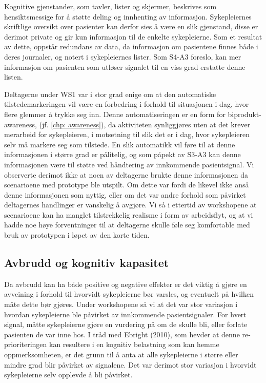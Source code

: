 \noindent
Kognitive gjenstander, som tavler, lister og skjermer, beskrives som hensiktsmessige for å støtte deling og innhenting av informasjon. Sykepleiernes skriftlige oversikt over pasienter kan derfor sies å være en slik gjenstand, disse er derimot private og gir kun informasjon til de enkelte sykepleierne. Som et resultat av dette, oppstår redundans av data, da informasjon om pasientene finnes både i deres journaler, og notert i sykepleiernes lister. Som S4-A3 foreslo, kan mer informasjon om pasienten som utløser signalet til en viss grad erstatte denne listen.

\noindent
Deltagerne under WS1 var i stor grad enige om at den automatiske tilstedemarkeringen vil være en forbedring i forhold til situasjonen i dag, hvor flere glemmer å trykke seg inn. Denne automatiseringen er en form for biprodukt-awareness, (jf. \ref{chp: awareness}), da aktiviteten synliggjøres uten at det krever merarbeid for sykepleieren, i motsetning til slik det er i dag, hvor sykepleieren selv må markere seg som tilstede. En slik automatikk vil føre til at denne informasjonen i større grad er pålitelig, og som påpekt av S3-A3 kan denne informasjonen være til støtte ved håndtering av innkommende pasientsignal. Vi observerte derimot ikke at noen av deltagerne brukte denne informasjonen da scenarioene med prototype ble utspilt. Om dette var fordi de likevel ikke anså denne informasjonen som nyttig, eller om det var andre forhold som påvirket deltagernes handlinger er vanskelig å avgjøre. Vi så i ettertid av workshopene at scenarioene kan ha manglet tilstrekkelig realisme i form av arbeidsflyt, og at vi hadde noe høye forventninger til at deltagerne skulle føle seg komfortable med bruk av prototypen i løpet av den korte tiden. 

\subsection{Avbrudd og kognitiv kapasitet}
Da avbrudd kan ha både positive og negative effekter er det viktig å gjøre en avveining i forhold til hvorvidt sykepleierne bør varsles, og eventuelt på hvilken måte dette bør gjøres. Under workshopene så vi at det var stor variasjon i hvordan sykepleierne ble påvirket av innkommende pasientsignaler. For hvert signal, måtte sykepleierne gjøre en vurdering på om de skulle bli, eller forlate pasienten de var inne hos. I tråd med Ebright (2010), som hevder at denne re-prioriteringen kan resultere i en kognitiv belastning som kan hemme oppmerksomheten, er det grunn til å anta at alle sykepleierne i større eller mindre grad blir påvirket av signalene. Det var derimot stor variasjon i hvorvidt sykepleierne selv opplevde å bli påvirket.

